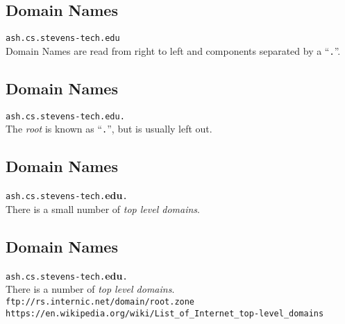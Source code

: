\documentclass[xga]{xdvislides}
\begin{document}
\subsection{Domain Names}
\vspace{.5in}
\begin{center}
	\Huge
	\verb+ash.cs.stevens-tech.edu+ \\
	\vspace{.5in}
	Domain Names are read from right to left and components separated by a ``\verb+.+''.
\end{center}
\Normalsize

\subsection{Domain Names}
\vspace{.5in}
\begin{center}
	\Huge
	\verb+ash.cs.stevens-tech.edu.+ \\
	\vspace{.5in}
	The {\em root} is known as ``\verb+.+'', but is usually left out.
\end{center}
\Normalsize

\subsection{Domain Names}
\vspace{.5in}
\begin{center}
	\Huge
	\verb+ash.cs.stevens-tech.+{\bf edu}\verb+.+ \\
	\vspace{.5in}
	There is a small number of {\em top level domains}.
\end{center}
\Normalsize

\subsection{Domain Names}
\vspace{.5in}
\begin{center}
	\Huge
	\verb+ash.cs.stevens-tech.+{\bf edu}\verb+.+ \\
	\vspace{.5in}
	There is a number of {\em top level domains}. \\
	\vspace{.5in}
	\verb+ftp://rs.internic.net/domain/root.zone+ \\
	\vspace{.25in}
	\Normalsize
	\verb+https://en.wikipedia.org/wiki/List_of_Internet_top-level_domains+
\end{center}
\Normalsize
\end{document}
